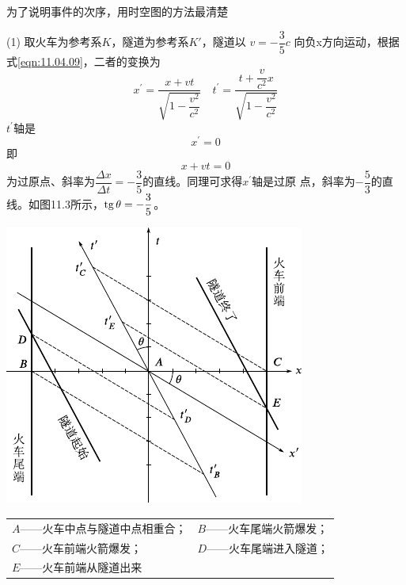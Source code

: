 \solution 为了说明事件的次序，用时空图的方法最清楚

(1) 取火车为参考系$ K $，隧道为参考系$ K' $，隧道以
$ v = - \dfrac { 3 } { 5 } c   $
向负x方向运动，根据式\eqref{eqn:11.04.09}，二者的变换为
\begin{equation*}
    x^{\prime}=\frac{x+v t}{\sqrt{1-\dfrac{v^{2}}{c^{2}}}} \quad t^{\prime}=\frac{t+\dfrac{v}{c^{2}} x}{\sqrt{1-\dfrac{v^{2}}{c^{2}}}}
\end{equation*}
$ t ^ { \prime } $轴是
\begin{equation*}
    x ^ { \prime } = 0
\end{equation*}
即
\begin{equation*}
    x + v t = 0
\end{equation*}
为过原点、斜率为$ \dfrac { \Delta x } { \Delta t } = - \dfrac { 3 } { 5 }  $的直线。同理可求得$ x ^ { \prime } $轴是过原
点，斜率为$  - \dfrac { 5 } { 3 }   $的直线。如图11.3所示，$  \operatorname{tg} \theta = - \dfrac { 3 } { 5 }  $。

\clearpage
\begin{figurex}
    \centering
    \includegraphics{figure/fig11.03}
    \caption{}
    \label{fig:11.03}
\end{figurex}

\begin{center}
    \begin{tabular}{ll}
        $ A $——火车中点与隧道中点相重合； & $ B $——火车尾端火箭爆发； \\
        $ C $——火车前端火箭爆发； & $ D $——火车尾端进入隧道； \\
        $ E $——火车前端从隧道出来 &  \\
    \end{tabular}
\end{center}

